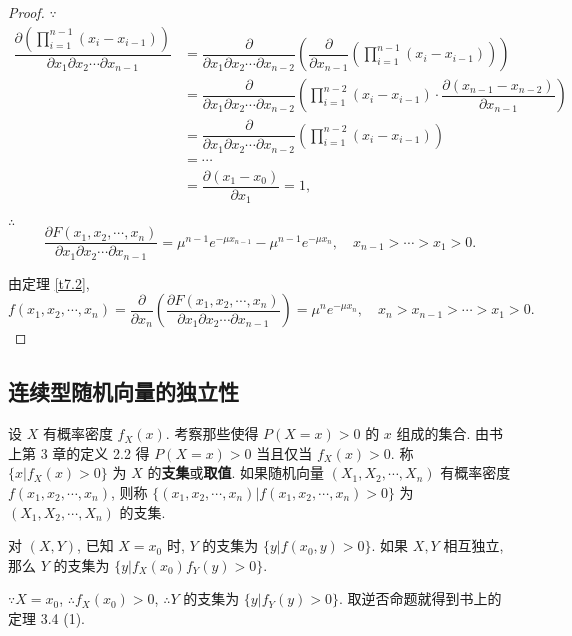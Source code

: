 \documentclass[color=black,device=normal,lang=cn]{elegantnote}
\numberwithin{equation}{section}
\theoremstyle{plain}
\numberwithin{exercise}{exsection}
\begin{document}
\begin{proof}
    $\because$
    \begin{align*}
        \dfrac{\partial\left(\prod\limits_{i=1}^{n-1}(x_i-x_{i-1})\right)}{\partial x_1\partial x_2\cdots\partial x_{n-1}} & =\dfrac{\partial}{\partial x_1\partial x_2\cdots\partial x_{n-2}}\left(\dfrac{\partial}{\partial x_{n-1}}\left(\prod\limits_{i=1}^{n-1}(x_i-x_{i-1})\right)\right) \\
        & =\dfrac{\partial}{\partial x_1\partial x_2\cdots\partial x_{n-2}}\left(\prod\limits_{i=1}^{n-2}(x_i-x_{i-1})\cdot\dfrac{\partial(x_{n-1}-x_{n-2})}{\partial x_{n-1}}\right) \\
        & =\dfrac{\partial}{\partial x_1\partial x_2\cdots\partial x_{n-2}}\left(\prod\limits_{i=1}^{n-2}(x_i-x_{i-1})\right) \\
        & =\cdots \\
        & =\dfrac{\partial(x_1-x_0)}{\partial x_1}=1,
    \end{align*}

    $\therefore$
    \[\dfrac{\partial F(x_1,x_2,\cdots,x_n)}{\partial x_1\partial x_2\cdots\partial x_{n-1}}=\mu^{n-1}e^{-\mu x_{n-1}}-\mu^{n-1}e^{-\mu x_n},\quad x_{n-1}>\cdots>x_1>0.\]

    由定理 \ref{t7.2},
    \[f(x_1,x_2,\cdots,x_n)=\dfrac{\partial}{\partial x_n}\left(\dfrac{\partial F(x_1,x_2,\cdots,x_n)}{\partial x_1\partial x_2\cdots\partial x_{n-1}}\right)=\mu^ne^{-\mu x_n},\quad x_n>x_{n-1}>\cdots>x_1>0.\]
\end{proof}
\subsection{连续型随机向量的独立性}
设 $X$ 有概率密度 $f_X(x)$. 考察那些使得 $P(X=x)>0$ 的 $x$ 组成的集合. 由书上第 3 章的定义 2.2 得 $P(X=x)>0$ 当且仅当 $f_X(x)>0$. 称 $\{x|f_X(x)>0\}$ 为 $X$ 的\textbf{支集}或\textbf{取值}. 如果随机向量 $(X_1,X_2,\cdots,X_n)$ 有概率密度 $f(x_1,x_2,\cdots,x_n)$, 则称 $\{(x_1,x_2,\cdots,x_n)|f(x_1,x_2,\cdots,x_n)>0\}$ 为 $(X_1,X_2,\cdots,X_n)$ 的支集.

对 $(X,Y)$, 已知 $X=x_0$ 时, $Y$ 的支集为 $\{y|f(x_0,y)>0\}$. 如果 $X,Y$ 相互独立, 那么 $Y$ 的支集为 $\{y|f_X(x_0)f_Y(y)>0\}$.

$\because X=x_0$, $\therefore f_X(x_0)>0$, $\therefore Y$ 的支集为 $\{y|f_Y(y)>0\}$. 取逆否命题就得到书上的定理 3.4 (1).
\end{document}

